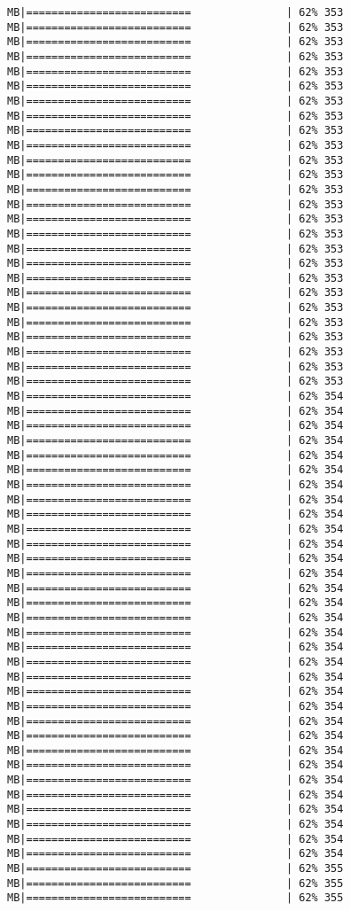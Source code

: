 \documentclass[
]{article}
\begin{document}
\begin{verbatim}
MB|==========================               | 62% 353 MB|==========================               | 62% 353 MB|==========================               | 62% 353 MB|==========================               | 62% 353 MB|==========================               | 62% 353 MB|==========================               | 62% 353 MB|==========================               | 62% 353 MB|==========================               | 62% 353 MB|==========================               | 62% 353 MB|==========================               | 62% 353 MB|==========================               | 62% 353 MB|==========================               | 62% 353 MB|==========================               | 62% 353 MB|==========================               | 62% 353 MB|==========================               | 62% 353 MB|==========================               | 62% 353 MB|==========================               | 62% 353 MB|==========================               | 62% 353 MB|==========================               | 62% 353 MB|==========================               | 62% 353 MB|==========================               | 62% 353 MB|==========================               | 62% 353 MB|==========================               | 62% 353 MB|==========================               | 62% 353 MB|==========================               | 62% 353 MB|==========================               | 62% 353 MB|==========================               | 62% 354 MB|==========================               | 62% 354 MB|==========================               | 62% 354 MB|==========================               | 62% 354 MB|==========================               | 62% 354 MB|==========================               | 62% 354 MB|==========================               | 62% 354 MB|==========================               | 62% 354 MB|==========================               | 62% 354 MB|==========================               | 62% 354 MB|==========================               | 62% 354 MB|==========================               | 62% 354 MB|==========================               | 62% 354 MB|==========================               | 62% 354 MB|==========================               | 62% 354 MB|==========================               | 62% 354 MB|==========================               | 62% 354 MB|==========================               | 62% 354 MB|==========================               | 62% 354 MB|==========================               | 62% 354 MB|==========================               | 62% 354 MB|==========================               | 62% 354 MB|==========================               | 62% 354 MB|==========================               | 62% 354 MB|==========================               | 62% 354 MB|==========================               | 62% 354 MB|==========================               | 62% 354 MB|==========================               | 62% 354 MB|==========================               | 62% 354 MB|==========================               | 62% 354 MB|==========================               | 62% 354 MB|==========================               | 62% 354 MB|==========================               | 62% 355 MB|==========================               | 62% 355 MB|==========================               | 62% 355 
\end{verbatim}
\end{document}
